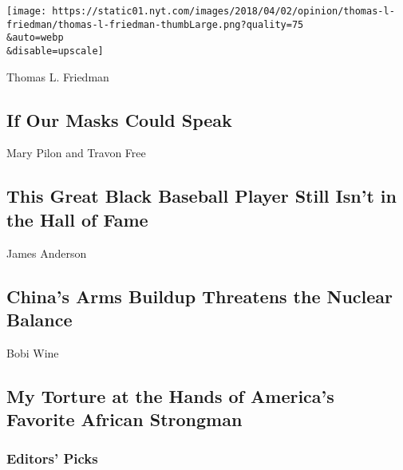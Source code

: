 \href{/2020/07/28/opinion/coronavirus-masks.html}{}

\texttt{[image: https://static01.nyt.com/images/2018/04/02/opinion/thomas-l-friedman/thomas-l-friedman-thumbLarge.png?quality=75\\\&auto=webp\\\&disable=upscale]}

Thomas L. Friedman

\hypertarget{if-our-masks-could-speak}{%
\subsection{If Our Masks Could Speak}\label{if-our-masks-could-speak}}

\href{/2020/07/29/opinion/john-donaldson-baseball-black-players.html}{}

Mary Pilon and Travon Free

\hypertarget{this-great-black-baseball-player-still-isnt-in-the-hall-of-fame}{%
\subsection{This Great Black Baseball Player Still Isn't in the Hall of
Fame}\label{this-great-black-baseball-player-still-isnt-in-the-hall-of-fame}}

\href{/2020/07/29/opinion/russia-china-nuclear-weapons.html}{}

James Anderson

\hypertarget{chinas-arms-buildup-threatens-the-nuclear-balance}{%
\subsection{China's Arms Buildup Threatens the Nuclear
Balance}\label{chinas-arms-buildup-threatens-the-nuclear-balance}}

\href{/2020/07/29/opinion/uganda-museveni-repression.html}{}

Bobi Wine

\hypertarget{my-torture-at-the-hands-of-americas-favorite-african-strongman}{%
\subsection{My Torture at the Hands of America's Favorite African
Strongman}\label{my-torture-at-the-hands-of-americas-favorite-african-strongman}}

\hypertarget{editors-picks}{%
\subsubsection{Editors' Picks}\label{editors-picks}}

